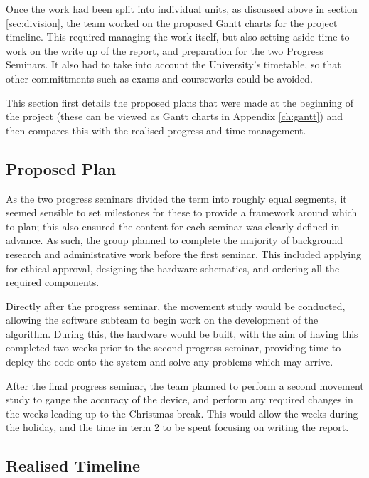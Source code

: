 
Once the work had been split into individual units, as discussed above in section \ref{sec:division}, the team worked on the proposed Gantt charts for the project timeline. This required managing the work itself, but also setting aside time to work on the write up of the report, and preparation for the two Progress Seminars. It also had to take into account the University's timetable, so that other committments such as exams and courseworks could be avoided.

This section first details the proposed plans that were made at the beginning of the project (these can be viewed as Gantt charts in Appendix \ref{ch:gantt}) and then compares this with the realised progress and time management.

\subsection{Proposed Plan}

As the two progress seminars divided the term into roughly equal segments, it seemed sensible to set milestones for these to provide a framework around which to plan; this also ensured the content for each seminar was clearly defined in advance. As such, the group planned to complete the majority of background research and administrative work before the first seminar. This included applying for ethical approval, designing the hardware schematics, and ordering all the required components.

Directly after the progress seminar, the movement study would be conducted, allowing the software subteam to begin work on the development of the algorithm. During this, the hardware would be built, with the aim of having this completed two weeks prior to the second progress seminar, providing time to deploy the code onto the system and solve any problems which may arrive.

After the final progress seminar, the team planned to perform a second movement study to gauge the accuracy of the device, and perform any required changes in the weeks leading up to the Christmas break. This would allow the weeks during the holiday, and the time in term 2 to be spent focusing on writing the report.

\subsection{Realised Timeline}

